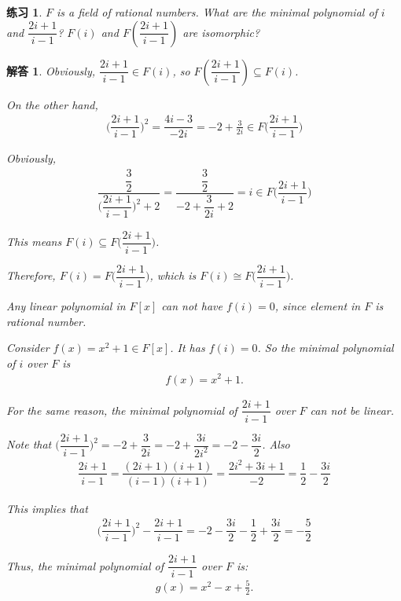 \documentclass[utf8]{ctexbook}
\newtheorem{exercise}{练习}[section]
\newtheorem*{soln}{解答}
\begin{document}
\begin{exercise}
$F$ is a field of rational numbers. What are the minimal polynomial of $i$ and $\dfrac{2i + 1}{i - 1}$? $F(i)$ and $F( \dfrac{2i + 1}{i - 1})$ are isomorphic?
\end{exercise}

\begin{soln}
Obviously, $\dfrac{2i + 1}{i - 1} \in F(i)$, so $F(\dfrac{2i + 1}{i - 1}) \subseteq F(i)$.

On the other hand,
\begin{align*}
\big( \dfrac{2i + 1}{i - 1}  \big)^2 = \dfrac{4i - 3}{-2i} = -2 + \frac{3}{2 i} \in F \big( \dfrac{2i + 1}{i - 1} \big)
\end{align*}

Obviously,
\begin{align*}
\dfrac{\dfrac{3}{2}}{\big( \dfrac{2i + 1}{i - 1}  \big)^2  + 2} = \dfrac{\dfrac{3}{2}}{ -2 + \dfrac{3}{2 i}  + 2} = i \in F \big( \dfrac{2i + 1}{i - 1} \big)
\end{align*}

This means $F(i) \subseteq F \big( \dfrac{2i + 1}{i - 1} \big)$.

Therefore, $F(i) = F \big( \dfrac{2i + 1}{i - 1} \big)$, which is $F(i) \cong F \big( \dfrac{2i + 1}{i - 1} \big)$.

Any linear polynomial in $F[x]$ can not have $f(i) =0$, since element in $F$ is rational number.

Consider $f(x)= x^2 + 1 \in F[x]$. It has $f(i) = 0$. So the minimal polynomial of $i$ over $F$ is 
\begin{align*}
f(x) = x^2 + 1.
\end{align*}

For the same reason, the minimal polynomial of $ \dfrac{2i + 1}{i - 1} $ over $F$ can not be linear.

Note that $ \big( \dfrac{2i + 1}{i - 1}  \big)^2 = -2 + \dfrac{3}{2 i} = -2 + \dfrac{3i}{2 i^2 } = -2 - \dfrac{3 i }{2} $. Also
\begin{align*}
\dfrac{2i + 1}{i - 1} = \dfrac{(2i + 1) (i + 1 )}{(i - 1) (i+1)} = \dfrac{ 2i^2 + 3i+ 1  }{- 2}  = \dfrac{1}{2} - \dfrac{3i}{2} 
\end{align*}

This implies that
\begin{align*}
\big( \dfrac{2i + 1}{i - 1}  \big)^2 - \dfrac{2i + 1}{i - 1} = -2 - \dfrac{3 i }{2} - \dfrac{1}{2} + \dfrac{3 i}{2}  = - \dfrac{5}{2}
\end{align*}

Thus, the minimal polynomial of $\dfrac{2i + 1}{i - 1}$ over $F$ is:
\begin{align*}
g(x) = x^2 - x + \frac{5}{2} .
\end{align*}

\end{soln}
\end{document}
